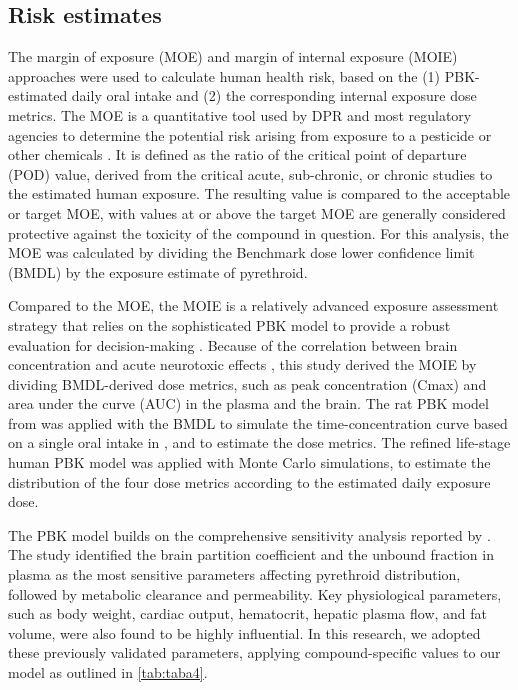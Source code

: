 \documentclass[toxics,article,submit,pdftex,moreauthors]{Definitions/mdpi}
\begin{document}
\subsection{Risk estimates}\label{risk-estimates}

The margin of exposure (MOE) and margin of internal exposure (MOIE) approaches
were used to calculate human health risk, based on the (1) PBK-estimated daily
oral intake and (2) the corresponding internal exposure dose metrics. The MOE
is a quantitative tool used by DPR and most regulatory agencies to determine
the potential risk arising from exposure to a pesticide or other chemicals
\citep{beaudouin2010stochastic, beauvais_human_2010}. It is defined as the
ratio of the critical point of departure (POD) value, derived from the critical
acute, sub-chronic, or chronic studies to the estimated human exposure. The
resulting value is compared to the acceptable or target MOE, with values at or
above the target MOE are generally considered protective against the toxicity
of the compound in question. For this analysis, the MOE was calculated by
dividing the Benchmark dose lower confidence limit (BMDL) by the exposure
estimate of pyrethroid.

Compared to the MOE, the MOIE is a relatively advanced exposure
assessment strategy that relies on the sophisticated PBK model to
provide a robust evaluation for decision-making
\citep{bessems_margin_2017}. Because of the correlation between brain
concentration and acute neurotoxic effects
\citep{scollon_correlation_2011}, this study derived the MOIE by
dividing BMDL-derived dose metrics, such as peak concentration (Cmax)
and area under the curve (AUC) in the plasma and the brain. The rat PBK
model from \citet{song2019evaluation} was applied with the BMDL to
simulate the time-concentration curve based on a single oral intake in
\citet{wolansky_relative_2006}, and to estimate the dose metrics. The
refined life-stage human PBK model was applied with Monte Carlo
simulations, to estimate the distribution of the four dose metrics
according to the estimated daily exposure dose. 

The PBK model builds on the comprehensive sensitivity analysis reported by
\citet{mallick2020development}. The study identified the brain partition coefficient and
the unbound fraction in plasma as the most sensitive parameters affecting
pyrethroid distribution, followed by metabolic clearance and permeability. Key
physiological parameters, such as body weight, cardiac output, hematocrit,
hepatic plasma flow, and fat volume, were also found to be highly influential.
In this research, we adopted these previously validated parameters,
applying compound-specific values to our model as outlined in \ref{tab:taba4}.
\end{document}
